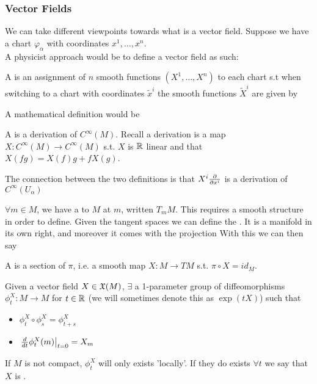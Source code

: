 \documentclass{article}
\begin{document}
\subsubsection{Vector Fields}
We can take different viewpoints towards what is a vector field. Suppose we have a chart $\varphi_\alpha$ with coordinates $x^1, \dots, x^n$. \\
A physicist approach would be to define a vector field as such:
\begin{definition}
A  is an assignment of $n$ smooth functions $(X^1, \dots, X^n)$ to each chart s.t when switching to a chart with coordinates $\tilde{x}^i$ the smooth functions $\tilde{X}^i$ are given by 
\end{definition}
A mathematical definition would be
\begin{definition}
 A  is a derivation of $C^\infty(M)$. Recall a derivation is a map $X:C^\infty(M) \to C^\infty(M)$ s.t. $X$ is $\mathbb{R}$ linear and that $X(fg) = X(f)g + fX(g)$. 
 \end{definition}
The connection between the two definitions is that $X^i \frac{\partial}{\partial x^i}$ is a derivation of $C^\infty(U_\alpha)$

$\forall m \in M$, we have a  to $M$ at $m$, written $T_m M$. This requires a smooth structure in order to define. Given the tangent spaces we can define 
the . It is a manifold in its own right, and moreover it comes with the projection 
With this we can then say
\begin{definition}
A  is a section of $\pi$, i.e. a smooth map $X:M \to TM$ s.t. $\pi \circ X = id_M$. 
\end{definition}


Given a vector field $X \in \mathfrak{X}(M)$, $\exists$ a 1-parameter group of diffeomorphisms $\phi_t^X:M \to M$ for $t \in \mathbb{R}$ (we will sometimes denote this as $\exp(tX)$) such that 
\begin{itemize}
	\item $\phi_t^X \circ \phi_s^X = \phi_{t+s}^X$
	\item $\left. \frac{d}{dt} \phi_t^X(m) \right\rvert_{t=0} = X_m$
\end{itemize}

If $M$ is not compact, $\phi_t^X$ will only exists 'locally'. If they do exists $\forall t$ we say that $X$ is . 
\end{document}

